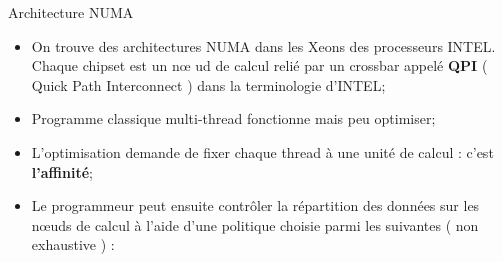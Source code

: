 \documentclass[handout]{beamer}
\begin{document}
\begin{frame}[fragile]{Architecture NUMA}

\small
 \begin{itemize}
  \item On trouve des architectures NUMA dans les Xeons des processeurs INTEL. Chaque chipset est un n{\oe}	ud de calcul
  relié par un crossbar appelé \textbf{QPI} ( Quick Path Interconnect ) dans la terminologie d'INTEL;
  \item Programme classique multi-thread fonctionne mais peu optimiser;
  \item L'optimisation demande de fixer chaque thread à une unité de calcul : c'est \textbf{l'affinité};
  \item Le programmeur peut ensuite contrôler la répartition des données sur les n{\oe}uds de calcul à
  l'aide d'une politique choisie parmi les suivantes ( non exhaustive ) :
  {\scriptsize
}
 \end{itemize}
\end{frame}
\end{document}
